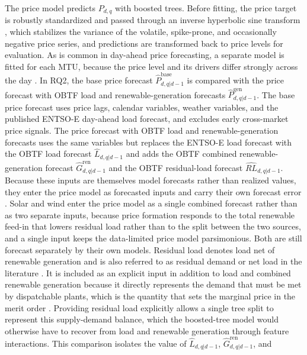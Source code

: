 The price model predicts \(P_{d,q}\) with boosted trees. Before fitting, the
price target is robustly standardized and passed through an inverse hyperbolic
sine transform \cite{uniejewski2018variance}, which stabilizes the variance of
the volatile, spike-prone, and occasionally negative price series, and
predictions are transformed back to price levels for evaluation. As is common in
day-ahead price forecasting, a separate model is fitted for each MTU, because the price level and its drivers differ strongly across the day
\cite{lago2021forecasting}. In RQ2, the base
price forecast \(\hat{P}^{\mathrm{base}}_{d,q|d-1}\) is compared with the
price forecast with OBTF load and renewable-generation forecasts
\(\hat{P}^{\mathrm{gen}}_{d,q|d-1}\). The base price forecast uses price lags,
calendar variables, weather variables, and the published \mbox{ENTSO-E}
day-ahead load forecast, and excludes early cross-market
price signals. The price forecast with OBTF load and renewable-generation forecasts uses the same
variables but replaces the \mbox{ENTSO-E} load forecast with the OBTF
load forecast \(\hat{L}_{d,q|d-1}\) and adds the OBTF combined
renewable-generation forecast \(\hat{G}^{\mathrm{ren}}_{d,q|d-1}\) and the
OBTF residual-load forecast \(\widehat{RL}_{d,q|d-1}\). Because these inputs are themselves model forecasts
rather than realized values, they enter the price model as forecasted inputs
and carry their own forecast error \cite{pagan1984generated}.
Solar and wind enter the price model as a single combined forecast rather than as
two separate inputs, because price formation responds to the total renewable
feed-in that lowers residual load rather than to the split between the two
sources, and a single input keeps the data-limited price model parsimonious. Both
are still forecast separately by their own models.
Residual load denotes load net of renewable generation and is also referred to
as residual demand or net load in the literature
\cite{do2021residualDemand}. It is included as an explicit input in addition
to load and combined renewable generation because it directly represents the
demand that must be met by dispatchable plants, which is the quantity that
sets the marginal price in the merit order \cite{sensfuss2008meritOrder}.
Providing residual load explicitly allows a single tree split to represent
this supply-demand balance, which the boosted-tree model would otherwise have
to recover from load and renewable generation through feature interactions.
This comparison isolates the value of \(\hat{L}_{d,q|d-1}\),
\(\hat{G}^{\mathrm{ren}}_{d,q|d-1}\), and

